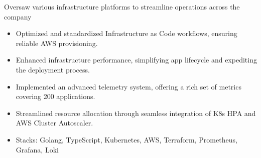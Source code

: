 \documentclass{resume}
\begin{document}
Oversaw various infrastructure platforms to streamline operations across the company
\begin{itemize}
  \item Optimized and standardized Infrastructure as Code workflows, ensuring reliable AWS provisioning.
  \item Enhanced infrastructure performance, simplifying app lifecycle and expediting the deployment process.
  \item Implemented an advanced telemetry system, offering a rich set of metrics covering 200 applications.
  \item Streamlined resource allocation through seamless integration of K8s HPA and AWS Cluster Autoscaler.
  \item Stacks: Golang, TypeScript, Kubernetes, AWS, Terraform, Prometheus, Grafana, Loki
\end{itemize}

\end{document}
